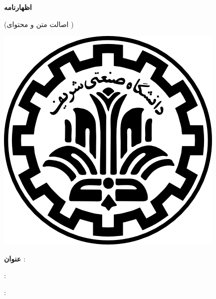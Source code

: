 
{\parindent0pt

\begin{center}
{\large\bf اظهارنامه}

{\small(اصالت متن و محتوای \ThesisType{} \ThesisDegree)}
\end{center}
\vspace{-6em}
\includegraphics[scale=0.15]{front/template/images/logo.png}
\vspace{1em}

\textbf{عنوان ‌\ThesisType}: \ThesisTitle

\vspace{.1em}
\begin{multicols}{2}
	{: \ThesisSupervisor}
	
	{: \ThesisAdvisor}
\end{multicols}

}
